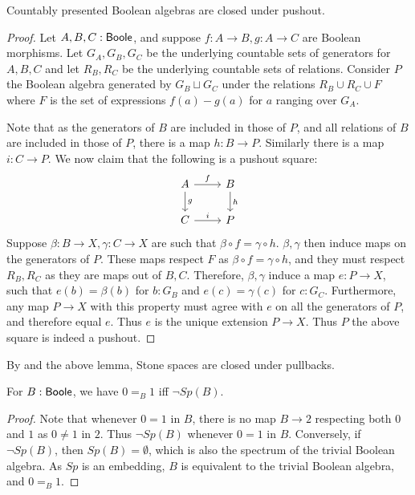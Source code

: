 \begin{lemma}\label{BoolePushouts}
  Countably presented Boolean algebras are closed under pushout. 
\end{lemma} 
\begin{proof}
  Let $A,B,C:\mathsf{Boole}$, and suppose $f:A\to B, g:A \to C$ are Boolean morphisms. 
  Let $G_A,G_B,G_C$ be the underlying countable sets of generators for $A,B,C$ and 
  let $R_B,R_C$ be the underlying countable sets of relations. 
  Consider $P$ the Boolean algebra generated by $G_B\sqcup G_C$ under the relations 
  $R_B\cup R_C \cup F$ where $F$ is the set of expressions $f(a)-g(a)$ for $a$ ranging over $G_A$. 
  
  Note that as the generators of $B$ are included in those of $P$, 
  and all relations of $B$ are included in those of $P$, there is a map $h:B\to P$. 
  Similarly there is a map $i:C\to P$. 
  We now claim that the following is a pushout square:
  \begin{equation}\begin{tikzcd}
    A \arrow[r,"f"] \arrow[d,"g"] & B \arrow[d,"h"]\\
    C \arrow[r,"i"] & P
  \end{tikzcd}\end{equation}  
  Suppose $\beta:B \to X, \gamma:C\to X$ are such that $\beta\circ f = \gamma \circ h$. 
  $\beta,\gamma$ then induce maps on the generators of $P$. 
  These maps respect $F$ as $\beta\circ f=\gamma\circ h$, and they must respect $R_B,R_C$ as they are maps out of $B,C$. 
  Therefore, $\beta,\gamma$ induce a map $e:P\to X$, such that 
  $e(b) = \beta(b)$ for $b:G_B$ and $e(c)=\gamma(c)$ for $c:G_C$. 
  Furthermore, any map $P\to X$ with this property must agree with $e$ on all the generators of $P$, 
  and therefore equal $e$. Thus $e$ is the unique extension $P\to X$. 
  Thus $P$ the above square is indeed a pushout. 
\end{proof}
\begin{corollary}
  By  and the above lemma, Stone spaces are closed under pullbacks. 
\end{corollary}


\begin{lemma}\label{SpectrumEmptyIff01Equal}
  For $B:\mathsf{Boole}$, we have $0=_B1$ iff $\neg Sp(B)$.
\end{lemma}
\begin{proof}
  Note that whenever $0=1$ in $B$, there is no map $B\to 2$ respecting both $0$ and $1$ as $0\neq 1$ in $2$. 
  Thus $\neg Sp(B)$ whenever $0=1$ in $B$. 
  Conversely, if $\neg Sp(B)$, then $Sp(B) = \emptyset$, which is also the spectrum of the trivial Boolean algebra. 
  As $Sp$ is an embedding, $B$ is equivalent to the trivial Boolean algebra, and $0=_B1$. 
\end{proof}

